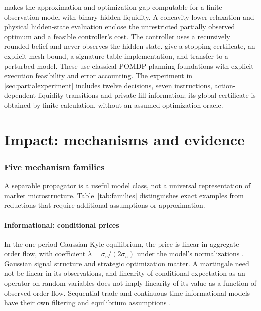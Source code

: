 \documentclass[11pt]{article}
\numberwithin{equation}{section}
\theoremstyle{definition}
\theoremstyle{remark}
\theoremstyle{definition}
\begin{document}
 makes the approximation and optimization gap
computable for a finite-observation model with binary hidden liquidity.
A concavity lower relaxation and physical hidden-state evaluation enclose
the unrestricted partially observed optimum and a feasible controller's cost.
The controller uses a recursively rounded belief and never observes the
hidden state. 
give a stopping certificate, an explicit mesh bound, a signature-table
implementation, and transfer to a perturbed model. These use classical
POMDP planning foundations with explicit execution feasibility and error
accounting. The experiment in \cref{sec:partialexperiment} includes twelve
decisions, seven instructions, action-dependent liquidity transitions and
private fill information; its global certificate is obtained by finite
calculation, without an assumed optimization oracle.

\part{Impact: mechanisms and evidence}\label{pt:lit}
\section{Five mechanism families}\label{sec:families}

A separable propagator is a useful model class, not a universal representation of
market microstructure. Table~\ref{tab:families} distinguishes exact examples from
reductions that require additional assumptions or approximation.

\subsection{Informational: conditional prices}

In the one-period Gaussian Kyle equilibrium, the price is linear in aggregate
order flow, with coefficient $\lambda=\sigma_v/(2\sigma_u)$ under the model's
normalizations \citep{kyle1985}. Gaussian signal structure and strategic
optimization matter. A martingale need not be linear in its observations, and
linearity of conditional expectation as an operator on random variables does
not imply linearity of its value as a function of observed order flow.
Sequential-trade and continuous-time informational models have their own
filtering and equilibrium assumptions \citep{glostenmilgrom1985,back1992}.
\end{document}

